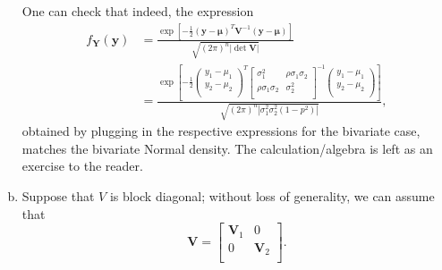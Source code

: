 \begin{enumerate}[a)]
    One can check that indeed, the expression
    \begin{align*}
        f_{\mathbf{Y}}(\mathbf{y}) &= \frac{\exp \left[ -\frac{1}{2}(\mathbf{y} -\mathbf{\mu})^T \mathbf{V}^{-1} (\mathbf{y} - \mathbf{\mu}) \right]}{\sqrt{(2\pi )^n |\det \mathbf{V}|}} \\
        &=\frac{\exp \left[ -\frac{1}{2}\begin{pmatrix}
             y_1 - \mu_1 \\
             y_2 - \mu_2 \\
        \end{pmatrix}^T \begin{bmatrix}
            \sigma_1^2 & \rho \sigma_1\sigma_2   \\
            \rho \sigma_1\sigma_2 & \sigma_2^2  \\
        \end{bmatrix}^{-1} \begin{pmatrix}
            y_1 - \mu_1 \\
            y_2 - \mu_2 \\
        \end{pmatrix}\right]}{\sqrt{(2\pi )^n |\sigma_1^2\sigma_2^2(1-p^2)|}},
    \end{align*}
    obtained by plugging in the respective expressions for the bivariate case, matches the bivariate Normal density. The calculation/algebra
    is left as an exercise to the reader.


    \item Suppose that $V$ is block diagonal; without loss of generality, we can assume that
    \[
        \mathbf{V} = \begin{bmatrix}
            \mathbf{V}_1 & 0 \\
            0 & \mathbf{V}_2  \\
        \end{bmatrix}.
    \]
    

\end{enumerate}
